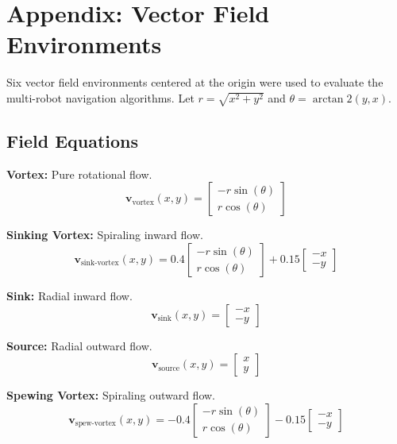 \section{Appendix: Vector Field Environments}
\label{sec:appendix_vector_fields}

Six vector field environments centered at the origin were used to evaluate the multi-robot navigation algorithms. Let $r = \sqrt{x^2 + y^2}$ and $\theta = \arctan2(y, x)$.

\subsection{Field Equations}

\textbf{Vortex:} Pure rotational flow.
\begin{equation}
\mathbf{v}_{\text{vortex}}(x, y) = \begin{bmatrix} -r \sin(\theta) \\ r \cos(\theta) \end{bmatrix}
\end{equation}

\textbf{Sinking Vortex:} Spiraling inward flow.
\begin{equation}
\mathbf{v}_{\text{sink-vortex}}(x, y) = 0.4 \begin{bmatrix} -r \sin(\theta) \\ r \cos(\theta) \end{bmatrix} + 0.15 \begin{bmatrix} -x \\ -y \end{bmatrix}
\end{equation}

\textbf{Sink:} Radial inward flow.
\begin{equation}
\mathbf{v}_{\text{sink}}(x, y) = \begin{bmatrix} -x \\ -y \end{bmatrix}
\end{equation}

\textbf{Source:} Radial outward flow.
\begin{equation}
\mathbf{v}_{\text{source}}(x, y) = \begin{bmatrix} x \\ y \end{bmatrix}
\end{equation}

\textbf{Spewing Vortex:} Spiraling outward flow.
\begin{equation}
\mathbf{v}_{\text{spew-vortex}}(x, y) = -0.4 \begin{bmatrix} -r \sin(\theta) \\ r \cos(\theta) \end{bmatrix} - 0.15 \begin{bmatrix} -x \\ -y \end{bmatrix}
\end{equation}

